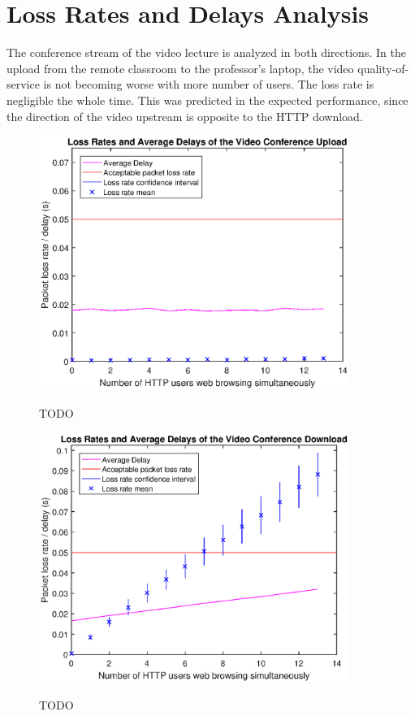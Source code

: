 \documentclass[a4paper,10pt]{book}\usepackage{graphicx}
\begin{document}
\section{Loss Rates and Delays Analysis}

The conference stream of the video lecture is analyzed in both directions. In the upload from the remote classroom to the professor's laptop, the video quality-of-service is not becoming worse with more number of users. The loss rate is  negligible the whole time. This was predicted in the expected performance, since the direction of the video upstream is opposite to the HTTP download.

\begin{figure}[!ht]
  \centering
    \includegraphics[width=0.9\textwidth]{on_loss_conf_upload.eps}
    \label{fig:on_loss_conf_upload}
    \caption{TODO}
\end{figure}

\begin{figure}[!ht]
  \centering
    \includegraphics[width=0.9\textwidth]{on_loss_conf_download.eps}
    \label{fig:on_loss_conf_download}
    \caption{TODO}
\end{figure}
\end{document}
